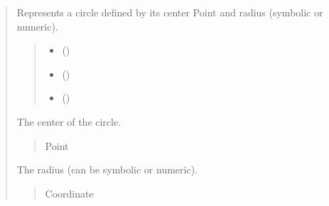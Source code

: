 \documentclass[letterpaper,10pt,english]{sphinxmanual}
\begin{document}
\begin{quote}
\begin{fulllineitems}
\sphinxAtStartPar
Represents a circle defined by its center Point and radius (symbolic or numeric).
\begin{quote}\begin{description}
\begin{itemize}
\item {} 
\sphinxAtStartPar
{} ()

\item {} 
\sphinxAtStartPar
{} (\sphinxstyleliteralemphasis{\sphinxupquote{ | }}\sphinxstyleliteralemphasis{\sphinxupquote{ | }}\sphinxstyleliteralemphasis{\sphinxupquote{ | }})

\item {} 
\sphinxAtStartPar
{} (\sphinxstyleliteralemphasis{\sphinxupquote{ | }})

\end{itemize}

\end{description}\end{quote}

\begin{fulllineitems}
\label{\detokenize{pygeox:pygeox.basic_objects.Circle.center}}
\pysigstartsignatures
\pysigline
{}
\pysigstopsignatures
\sphinxAtStartPar
The center of the circle.
\begin{quote}\begin{description}
\sphinxAtStartPar
Point

\end{description}\end{quote}

\end{fulllineitems}


\begin{fulllineitems}
\label{\detokenize{pygeox:pygeox.basic_objects.Circle.radius}}
\pysigstartsignatures
\pysigline
{}
\pysigstopsignatures
\sphinxAtStartPar
The radius (can be symbolic or numeric).
\begin{quote}\begin{description}
\sphinxAtStartPar
Coordinate


\end{description}
\end{quote}
\end{fulllineitems}
\end{fulllineitems}
\end{quote}
\end{document}
